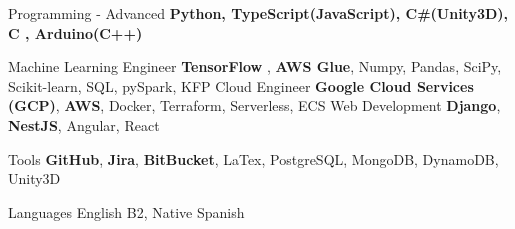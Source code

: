 \cvskill
{Programming - Advanced} %
{\textbf{Python, TypeScript(JavaScript), C\#(Unity3D), C , Arduino(C++)}} %

\cvskill
{Machine Learning Engineer}
{\textbf{TensorFlow} , \textbf{AWS Glue}, Numpy, Pandas, SciPy, Scikit-learn, SQL, pySpark, KFP}
\cvskill
{Cloud Engineer}
{\textbf{Google Cloud Services (GCP)}, \textbf{AWS}, Docker, Terraform, Serverless, ECS}
\cvskill
{Web Development} %
{\textbf{Django}, \textbf{NestJS}, Angular, React} %

\cvskill
{Tools}
{\textbf{GitHub}, \textbf{Jira}, \textbf{BitBucket}, LaTex, PostgreSQL, MongoDB, DynamoDB, Unity3D}

\cvskill
{Languages} %
{English B2, Native Spanish} %


